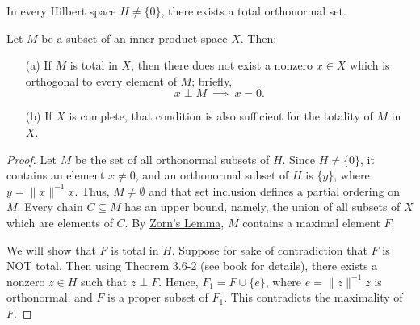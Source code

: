 \begin{definition}
    In every Hilbert space \( H \neq \{  0  \}  \), there exists a total orthonormal set.
\end{definition}

\begin{theorem}
   Let \( M  \) be a subset of an inner product space \( X  \). Then: 
   \begin{enumerate}
       \item[(a)] If \( M  \) is total in \( X  \), then there does not exist a nonzero \( x \in X  \) which is orthogonal to every element of \( M  \); briefly,   
           \[  x \perp M \ \implies \ x = 0.  \]
        \item[(b)] If \( X  \) is complete, that condition is also sufficient for the totality of \( M \) in \( X  \).
   \end{enumerate}
\end{theorem}

\begin{proof}
Let \( M  \) be the set of all orthonormal subsets of \( H  \). Since \( H \neq \{  0  \}  \), it contains an element \( x \neq 0  \), and an orthonormal subset of \( H  \) is \( \{  y  \}  \), where \( y = \|x\|^{-1} x  \). Thus, \( M \neq \emptyset \) and that set inclusion defines a partial ordering on \( M  \). Every chain \( C \subseteq  M   \) has an upper bound, namely, the union of all subsets of \( X  \) which are elements of \( C  \). By {\hyperref[Zorn's Lemma]{Zorn's Lemma}}, \( M  \) contains a maximal element \( F  \). 

We will show that \( F \) is total in \( H  \). Suppose for sake of contradiction that \( F  \) is NOT total. Then using Theorem 3.6-2 (see book for details), there exists a nonzero \( z \in H  \) such that \( z \perp F  \). Hence, \( {F}_{1} = F \cup \{ e  \}  \), where \( e = \|z\|^{-1} z  \) is orthonormal, and \( F  \) is a proper subset of \( {F}_{1} \). This contradicts the maximality of \( F  \). 
\end{proof}


